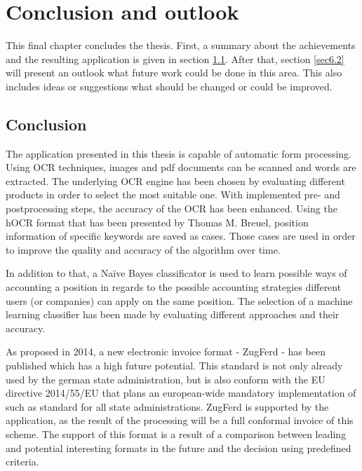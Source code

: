 %
% 
\chapter{Conclusion and outlook}
\label{cha6}

This final chapter concludes the thesis. First, a summary about the achievements and the resulting application is given in section \ref{sec6.1}. After that, section \ref{sec6.2} will present an outlook what future work could be done in this area. This also includes ideas or suggestions what should be changed or could be improved.

\section{Conclusion}
\label{sec6.1}

The application presented in this thesis is capable of automatic form processing. Using OCR techniques, images and pdf documents can be scanned and words are extracted. The underlying OCR engine has been chosen by evaluating different products in order to select the most suitable one.
With implemented pre- and postprocessing steps, the accuracy of the OCR has been enhanced. Using the hOCR format that has been presented by Thomas M. Breuel\cite{Breuel07}, position information of specific keywords are saved as cases. Those cases are used in order to improve the quality and accuracy of the algorithm over time. 

In addition to that, a Na{\"i}ve Bayes classificator is used to learn possible ways of accounting a position in regards to the possible accounting strategies different users (or companies) can apply on the same position. The selection of a machine learning classifier has been made by evaluating different approaches and their accuracy. 

As proposed in 2014, a new electronic invoice format - ZugFerd - has been published which has a high future potential\cite{Ferd14}. This standard is not only already used by the german state administration, but is also conform with the EU directive 2014/55/EU that plans an european-wide mandatory implementation of such as standard for all state administrations. 
ZugFerd is supported by the application, as the result of the processing will be a full conformal invoice of this scheme. The support of this format is a result of a comparison between leading and potential interesting formats in the future and the decision using predefined criteria.

